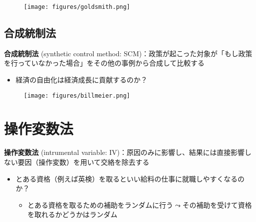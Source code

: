 \documentclass[
  xelatex,
  ja=standard]{bxjsarticle}
\providecommand{\tightlist}{%
  \setlength{\itemsep}{0pt}\setlength{\parskip}{0pt}}\usepackage{longtable,booktabs,array}
\begin{document}
\begin{figure}[htpb]

{\centering \texttt{[image: figures/goldsmith.png]}

}

\caption{\citet{goldsmith2021}}

\end{figure}

\hypertarget{ux5408ux6210ux7d71ux5236ux6cd5}{%
\subsection{合成統制法}\label{ux5408ux6210ux7d71ux5236ux6cd5}}

\textbf{合成統制法} (synthetic control method:
SCM)：政策が起こった対象が「もし政策を行っていなかった場合」をその他の事例から合成して比較する

\begin{itemize}
\tightlist
\item
  経済の自由化は経済成長に貢献するのか？
\end{itemize}

\begin{figure}[htpb]

{\centering \texttt{[image: figures/billmeier.png]}

}

\caption{\citet{billmeier2013}}

\end{figure}

\hypertarget{ux64cdux4f5cux5909ux6570ux6cd5}{%
\section{操作変数法}\label{ux64cdux4f5cux5909ux6570ux6cd5}}

\textbf{操作変数法} (intrumental variable:
IV)：原因のみに影響し、結果には直接影響しない要因（操作変数）を用いて交絡を除去する

\begin{itemize}
\tightlist
\item
  とある資格（例えば英検）を取るといい給料の仕事に就職しやすくなるのか？

  \begin{itemize}
  \tightlist
  \item
    とある資格を取るための補助をランダムに行う\(\leadsto\)その補助を受けて資格を取れるかどうかはランダム
  \end{itemize}
\end{itemize}
\end{document}
